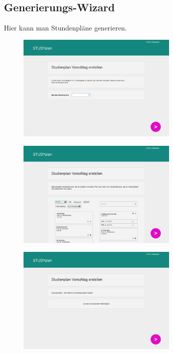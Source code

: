 \subsection{Generierungs-Wizard}
Hier kann man Stundenpläne generieren.
\begin{figure}[!htb]
	\caption{}
	\label{fig:gui-generierung-1}
	\centering
	\includegraphics[width=0.7\textwidth]{../GUI/ergebnisse/generierung-1.png}
\end{figure}

\begin{figure}[!htb]
	\caption{}
	\label{fig:gui-generierung-2}
	\centering
	\includegraphics[width=0.7\textwidth]{../GUI/ergebnisse/generierung-2.png}
\end{figure}

\begin{figure}[!htb]
	\caption{}
	\label{fig:gui-generierung-3}
	\centering
	\includegraphics[width=0.7\textwidth]{../GUI/ergebnisse/generierung-3.png}
\end{figure}

